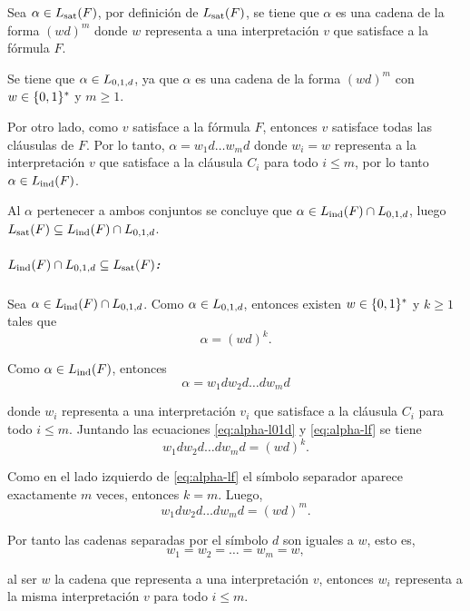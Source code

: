 \hfill

Sea $\alpha \in L_{\mathrm{sat}}(F)$, por definición de $L_{\mathrm{sat}}(F)$, se tiene que $\alpha$ es una cadena de la forma $(wd)^m$ donde $w$ representa a una interpretación $v$ que satisface a la fórmula $F$.

Se tiene que $\alpha \in L_{0,1,d}$, ya que $\alpha$ es una cadena de la forma $(wd)^m$ con $w \in \{0, 1\}^*$ y $m \geq 1$.

Por otro lado, como $v$ satisface a la fórmula $F$, entonces $v$ satisface todas las cláusulas de $F$. Por lo tanto, $\alpha = w_1d \ldots w_md$ donde $w_i = w$ representa a la interpretación $v$ que satisface a la cláusula $C_i$ para todo $i \leq m$, por lo tanto $\alpha \in L_{\mathrm{ind}}(F)$.

Al $\alpha$ pertenecer a ambos conjuntos se concluye que $\alpha \in L_{\mathrm{ind}}(F) \cap L_{0,1,d}$, luego $L_{\mathrm{sat}}(F) \subseteq L_{\mathrm{ind}}(F) \cap L_{0,1,d}$.


\subparagraph{$L_{\mathrm{ind}}(F) \cap L_{0,1,d} \subseteq L_{\mathrm{sat}}(F)$:}

\hfill

Sea $\alpha \in L_{\mathrm{ind}}(F) \cap L_{0,1,d}$. Como $\alpha \in L_{0,1,d}$, entonces existen $w \in \{0, 1\}^*$ y $k \geq 1$ tales que
\begin{equation}
    \alpha = (wd)^k.
    \label{eq:alpha-l01d}
\end{equation}

Como $\alpha \in L_{\mathrm{ind}}(F)$, entonces
\begin{equation}
    \label{eq:alpha-lf}
    \alpha = w_1 d w_2 d \ldots d w_m d
\end{equation}

donde $w_i$ representa a una interpretación $v_i$ que satisface a la cláusula $C_i$ para todo $i \leq m$. Juntando las ecuaciones \ref{eq:alpha-l01d} y \ref{eq:alpha-lf} se tiene
\begin{equation}
    w_1 d w_2 d \ldots d w_m d = (wd)^k.
\end{equation}

Como en el lado izquierdo de \ref{eq:alpha-lf} el símbolo separador aparece exactamente $m$ veces, entonces $k = m$. Luego,
\begin{equation}
    w_1 d w_2 d \ldots d w_m d = (wd)^m.
\end{equation}

Por tanto las cadenas separadas por el símbolo $d$ son iguales a $w$, esto es, $$
    w_1 = w_2 = \ldots = w_m = w,
$$

al ser $w$ la cadena que representa a una interpretación $v$, entonces $w_i$ representa a la misma interpretación $v$ para todo $i \leq m$.

